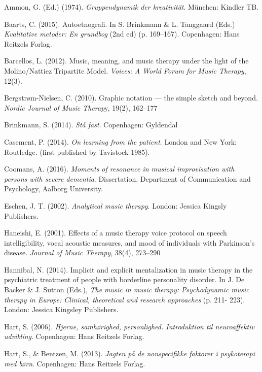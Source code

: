 \label{paper2:references}
\begin{thebibliography}{99}

\item Ammon, G. (Ed.) (1974). \textit{Gruppendynamik der kreativität}. München: Kindler TB.
\item Baarts, C. (2015). Autoetnografi.  In S. Brinkmann \& L. Tanggaard (Eds.) \textit{Kvalitative metoder: En grundbog} (2nd ed) (p. 169–167). Copenhagen: Hans Reitzels Forlag. 
\item Barcellos, L. (2012). Music, meaning, and music therapy under the light of the Molino/Nattiez Tripartite Model. \textit{Voices: A World Forum for Music Therapy}, 12(3).
\item Bergstrøm-Nielsen, C. (2010). Graphic notation –-- the simple sketch and beyond. \textit{Nordic Journal of Music Therap}y, 19(2), 162–177
\item Brinkmann, S. (2014). \textit{Stå fast}. Copenhagen: Gyldendal
\item Casement, P. (2014). \textit{On learning from the patient}. London and New York: Routledge. (first published by Tavistock 1985).
\item Coomans, A. (2016). \textit{Moments of resonance in musical improvisation with persons with severe dementia}. Dissertation, Department of Communication and Psychology, Aalborg University. 
\item Eschen, J. T. (2002). \textit{Analytical music therapy}. London: Jessica Kingsly Publishers.
\item Haneishi, E. (2001). Effects of a music therapy voice protocol on speech intelligibility, vocal acoustic measures, and mood of individuals with Parkinson's disease. \textit{Journal of Music Therapy}, 38(4), 273–290
\item Hannibal, N. (2014). Implicit and explicit mentalization in music therapy in the psychiatric treatment of people with borderline personality disorder. In J. De Backer \& J. Sutton (Eds.), \textit{The music in music therapy: Psychodynamic music therapy in Europe: Clinical, theoretical and research approaches} (p. 211- 223). London: Jessica Kingsley Publishers.
\item Hart, S. (2006). \textit{Hjerne, samhørighed, personlighed. Introduktion til neuroaffektiv udvikling}. Copenhagen: Hans Reitzels Forlag.
\item Hart, S., \& Bentzen, M. (2013). \textit{Jagten på de nonspecifikke faktorer i psykoterapi med børn}. Copenhagen: Hans Reitzels Forlag.  

\end{thebibliography}
